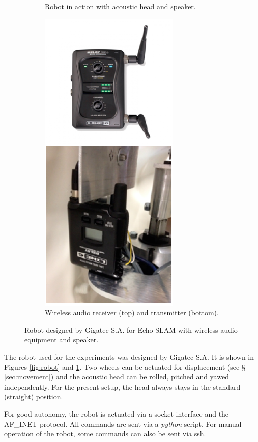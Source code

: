 \begin{figure}[H]
\begin{subfigure}{0.3\linewidth}
        \caption{Robot in action with acoustic head and speaker.}
        \label{fig:robot_action}
    \end{subfigure}
    \hspace{0.5em}
    \begin{subfigure}{0.3\linewidth}
        \centering
        \includegraphics[height=0.3\textheight]{files/Wireless.png}
        \caption{Wireless audio receiver (top) and transmitter (bottom).}
        \label{fig:audio}
    \end{subfigure}
    \caption{Robot designed by Gigatec S.A. for Echo SLAM with wireless audio equipment and speaker.}
\end{figure}

The robot used for the experiments was designed by Gigatec S.A. It is shown in Figures \ref{fig:robot} and \ref{fig:robot_action}.
Two wheels can be actuated for displacement (see § \ref{sec:movement}) and the acoustic head can be rolled, pitched and yawed independently. 
For the present setup, the head always stays in the standard (straight) position.

For good autonomy, the robot is actuated via a socket interface and the AF\_INET protocol. All commands are sent via a \textit{python} script. For manual operation of the robot, some commands can also be sent via ssh.
